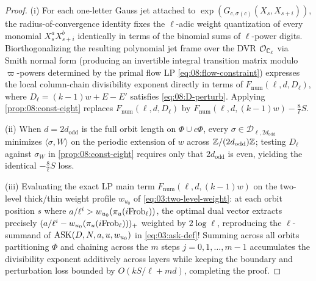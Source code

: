 \begin{proof}
(i) For each one-letter Gauss jet attached to $\exp(G_{c,\sigma(c)}(X_s, X_{s+i}))$, the radius-of-convergence identity fixes the $\ell$-adic weight quantization of every monomial $X_s^a X_{s+i}^b$ identically in terms of the binomial sums of $\ell$-power digits. Biorthogonalizing the resulting polynomial jet frame over the DVR $\mathcal{O}_{\mathbb{C}_\ell}$ via Smith normal form (producing an invertible integral transition matrix modulo $\varpi$-powers determined by the primal flow LP \eqref{eq:08:flow-constraint}) expresses the local column-chain divisibility exponent directly in terms of $F_{\mathrm{num}}(\ell, d, D_\ell)$, where $D_\ell = (k-1)w + E - E'$ satisfies \eqref{eq:08:D-perturb}. Applying \cref{prop:08:const-eight} replaces $F_{\mathrm{num}}(\ell, d, D_\ell)$ by $F_{\mathrm{num}}(\ell, d, (k-1)w) - \frac{8}{\ell} S$.

(ii) When $d = 2 d_{\mathrm{odd}}$ is the full orbit length on $\Phi \cup c\Phi$, every $\sigma \in \mathcal{D}_{\ell, 2d_{\mathrm{odd}}}$ minimizes $\langle \sigma, W \rangle$ on the periodic extension of $w$ across $\mathbb{Z}/(2d_{\mathrm{odd}})\mathbb{Z}$; testing $D_\ell$ against $\sigma_W$ in \cref{prop:08:const-eight} requires only that $2d_{\mathrm{odd}}$ is even, yielding the identical $-\frac{8}{\ell} S$ loss.

(iii) Evaluating the exact LP main term $F_{\mathrm{num}}(\ell, d, (k-1)w)$ on the two-level thick/thin weight profile $w_{u_0}$ of \eqref{eq:03:two-level-weight}: at each orbit position $s$ where $a / \ell^i > w_{u_0}(\pi_u(i\mathrm{Frob}_\ell))$, the optimal dual vector extracts precisely $(a/\ell^i - w_{u_0}(\pi_u(i\mathrm{Frob}_\ell)))_+$ weighted by $2\log\ell$, reproducing the $\ell$-summand of $\mathrm{ASK}(D, N, a, u, w_{u_0})$ in \eqref{eq:03:ask-def}! Summing across all orbits partitioning $\Phi$ and chaining across the $m$ steps $j = 0, 1, \dots, m - 1$ accumulates the divisibility exponent additively across layers while keeping the boundary and perturbation loss bounded by $O(k S / \ell + m d)$, completing the proof.
\end{proof}

